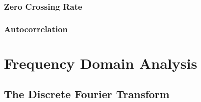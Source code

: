 \subsubsection{Zero Crossing Rate}
\label{ssubs:Zero Crossing Rate}


\subsubsection{Autocorrelation}
\label{ssubs:autocorrelation}



\section{Frequency Domain Analysis}
\label{sec:freq_domain_analysis}


\subsection{The Discrete Fourier Transform}
\label{sub:discrete_fourier_transform}
